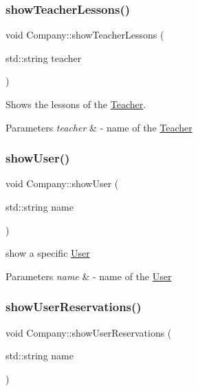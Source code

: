 \subsubsection{\texorpdfstring{show\+Teacher\+Lessons()}{showTeacherLessons()}}
{\footnotesize\ttfamily void Company\+::show\+Teacher\+Lessons (\begin{DoxyParamCaption}\item[{std\+::string}]{teacher }\end{DoxyParamCaption})}



Shows the lessons of the \mbox{\hyperlink{class_teacher}{Teacher}}. 


\begin{DoxyParams}{Parameters}
{\em teacher} & -\/ name of the \mbox{\hyperlink{class_teacher}{Teacher}} \\
\hline
\end{DoxyParams}
\mbox{\label{class_company_a664aa9b9bde35eae3a564edec73cf5b3}} 
\subsubsection{\texorpdfstring{show\+User()}{showUser()}}
{\footnotesize\ttfamily void Company\+::show\+User (\begin{DoxyParamCaption}\item[{std\+::string}]{name }\end{DoxyParamCaption})}



show a specific \mbox{\hyperlink{class_user}{User}} 


\begin{DoxyParams}{Parameters}
{\em name} & -\/ name of the \mbox{\hyperlink{class_user}{User}} \\
\hline
\end{DoxyParams}
\mbox{\label{class_company_a428b70dbf9acd5edb34ee131ff1f8613}} 
\subsubsection{\texorpdfstring{show\+User\+Reservations()}{showUserReservations()}}
{\footnotesize\ttfamily void Company\+::show\+User\+Reservations (\begin{DoxyParamCaption}\item[{std\+::string}]{name }\end{DoxyParamCaption})}



